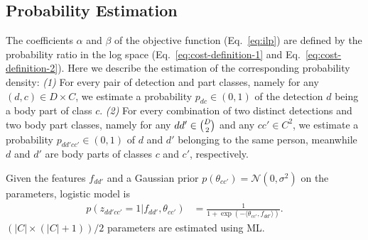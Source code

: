 \subsection{Probability Estimation} %
\label{sec:probability-estimation}
The coefficients $\alpha$ and $\beta $ of the objective function
(Eq.~\ref{eq:ilp}) are defined by the probability ratio
in the log space (Eq.~\ref{eq:cost-definition-1} and
Eq.~\ref{eq:cost-definition-2}).  Here we describe the estimation of
the corresponding probability density: {\it (1)} For every pair of
detection and part classes, namely for any $(d, c) \in D \times C$, we
estimate a probability $p_{dc} \in (0,1)$ of the detection $d$ being a
body part of class $c$.  {\it (2)} For every combination of two
distinct detections and two body part classes, namely for any $dd' \in
\tbinom{D}{2}$ and any $cc' \in C^2$, we estimate a probability
$p_{dd'cc'} \in (0,1)$ of $d$ and $d'$ belonging to the same person,
meanwhile $d$ and $d'$ are body parts of classes $c$ and $c'$,
respectively.

Given the features $f_{dd'}$ and a Gaussian prior $p(\theta_{cc'}) =
\mathcal{N}(0,\sigma^2)$ on the parameters, logistic model is
\begin{align}
\label{eq:z-probability}
p(z_{dd'cc'} = 1 | f_{dd'}, \theta_{cc'}) & = \frac{1}{1 + \exp(-\langle \theta_{cc'}, f_{dd'} \rangle)}.
\end{align}
$(|C|\times (|C| + 1))/2 $ parameters are estimated using ML.

